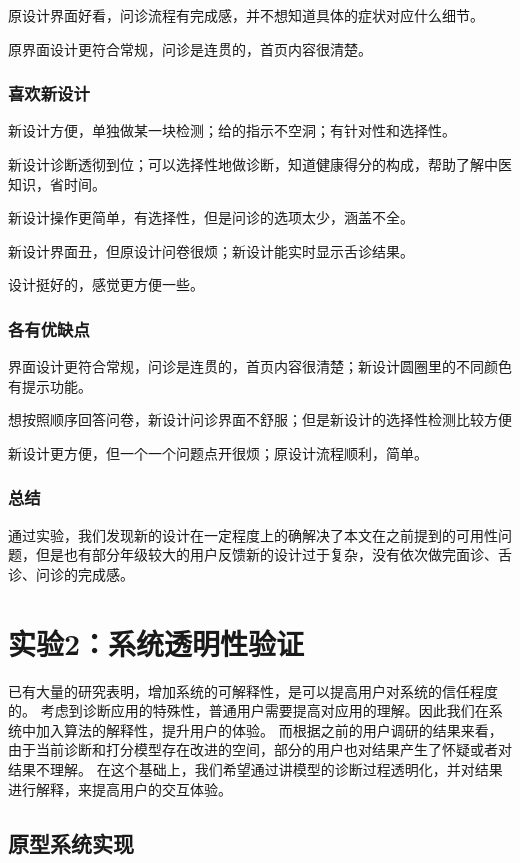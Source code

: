 原设计界面好看，问诊流程有完成感，并不想知道具体的症状对应什么细节。

原界面设计更符合常规，问诊是连贯的，首页内容很清楚。


\subsubsection{喜欢新设计}

新设计方便，单独做某一块检测；给的指示不空洞；有针对性和选择性。

新设计诊断透彻到位；可以选择性地做诊断，知道健康得分的构成，帮助了解中医知识，省时间。

新设计操作更简单，有选择性，但是问诊的选项太少，涵盖不全。

新设计界面丑，但原设计问卷很烦；新设计能实时显示舌诊结果。

设计挺好的，感觉更方便一些。


\subsubsection{各有优缺点}

界面设计更符合常规，问诊是连贯的，首页内容很清楚；新设计圆圈里的不同颜色有提示功能。

想按照顺序回答问卷，新设计问诊界面不舒服；但是新设计的选择性检测比较方便

新设计更方便，但一个一个问题点开很烦；原设计流程顺利，简单。

\subsubsection{总结}
通过实验，我们发现新的设计在一定程度上的确解决了本文在之前提到的可用性问题，但是也有部分年级较大的用户反馈新的设计过于复杂，没有依次做完面诊、舌诊、问诊的完成感。

\section{实验2：系统透明性验证}

已有大量的研究表明，增加系统的可解释性，是可以提高用户对系统的信任程度的。
考虑到诊断应用的特殊性，普通用户需要提高对应用的理解。因此我们在系统中加入算法的解释性，提升用户的体验。
而根据之前的用户调研的结果来看，由于当前诊断和打分模型存在改进的空间，部分的用户也对结果产生了怀疑或者对结果不理解。
在这个基础上，我们希望通过讲模型的诊断过程透明化，并对结果进行解释，来提高用户的交互体验。

\subsection{原型系统实现}

